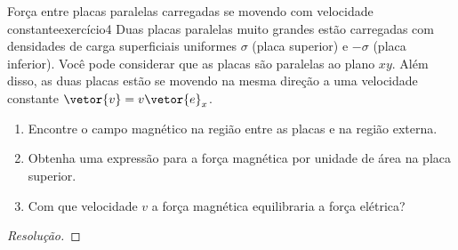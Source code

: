 \begin{exercício}{Força entre placas paralelas carregadas se movendo com velocidade constante}{exercício4}
    Duas placas paralelas muito grandes estão carregadas com densidades de carga superficiais uniformes \(\sigma\) (placa superior) e \(-\sigma\) (placa inferior). Você pode considerar que as placas são paralelas ao plano \(xy\). Além disso, as duas placas estão se movendo na mesma direção a uma velocidade constante \(\vetor{v} = v\vetor{e}_x\).
    \begin{enumerate}[label=(\alph*)]
        \item Encontre o campo magnético na região entre as placas e na região externa.
        \item Obtenha uma expressão para a força magnética por unidade de área na placa superior.
        \item Com que velocidade \(v\) a força magnética equilibraria a força elétrica?
    \end{enumerate}
\end{exercício}
\begin{proof}[Resolução]

\end{proof}
